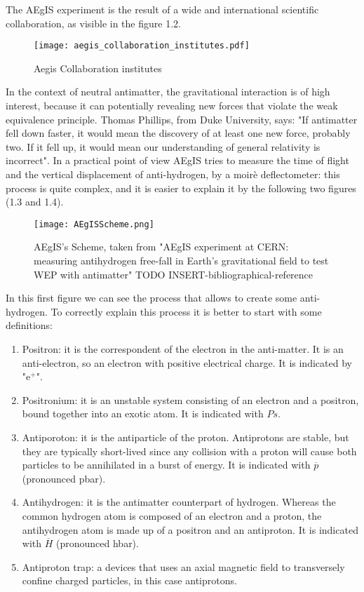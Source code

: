 The AEgIS experiment is the result of a wide and international scientific collaboration, as visible in the figure 1.2.

\begin{figure}[H]
\centering 
\texttt{[image: aegis\_collaboration\_institutes.pdf]} 
\caption{Aegis Collaboration institutes}
\end{figure}


In the context of neutral antimatter, the gravitational interaction is of high interest, because it can potentially revealing new forces that violate the weak equivalence principle. Thomas Phillips, from Duke University, says: "If antimatter fell down faster, it would mean the discovery of at least one new force, probably two. If it fell up, it would mean our understanding of general relativity is incorrect". In a practical point of view AEgIS tries to measure the time of flight and the vertical displacement of anti-hydrogen, by a moirè deflectometer: this process is quite complex, and it is easier to explain it by the following two figures (1.3 and 1.4).

\begin{figure}[H]
\centering 
\texttt{[image: AEgISScheme.png]} 
\caption{AEgIS's Scheme, taken from "AEgIS experiment at CERN: measuring antihydrogen free-fall in Earth’s gravitational field to test WEP with antimatter" TODO INSERT-bibliographical-reference}
\end{figure}

In this first figure we can see the process that allows to create some anti-hydrogen. To correctly explain this process it is better to start with some definitions:


\begin{enumerate}

\item Positron: it is the correspondent of the electron in the anti-matter. It is an anti-electron, so an electron with positive electrical charge. It is indicated by "e$^{+}$".

\item Positronium: it is an unstable system consisting of an electron and a positron, bound together into an exotic atom. It is indicated with $ {Ps} $.

\item Antiporoton: it is the antiparticle of the proton. Antiprotons are stable, but they are typically short-lived since any collision with a proton will cause both particles to be annihilated in a burst of energy. It is indicated with $ \overline{p} $ (pronounced pbar).

\item Antihydrogen: it is the antimatter counterpart of hydrogen. Whereas the common hydrogen atom is composed of an electron and a proton, the antihydrogen atom is made up of a positron and an antiproton. It is indicated with $ \overline{H} $ (pronounced hbar).


\item Antiproton trap: a devices that uses an axial magnetic field to transversely confine charged particles, in this case antiprotons.


\end{enumerate}

